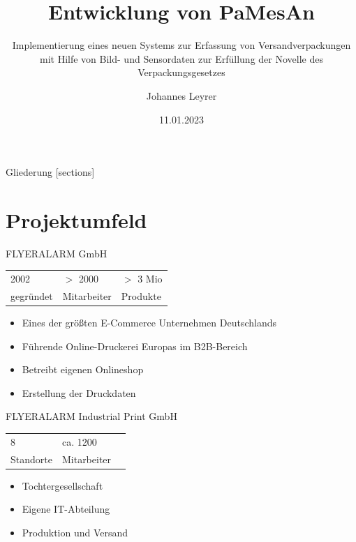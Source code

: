 \documentclass[10pt,ngerman]{beamer}
\title{Entwicklung von PaMesAn}
\date{11.01.2023}
\author{Johannes Leyrer}
\institute{FLYERALARM}
\subtitle{Implementierung eines neuen Systems zur Erfassung von Versandverpackungen mit Hilfe von Bild- und Sensordaten zur Erfüllung der Novelle des Verpackungsgesetzes}
\begin{document}
\maketitle

\begin{frame}{Gliederung}
  [sections]
  \tableofcontents[hideallsubsections]
\end{frame}

\section{Projektumfeld}
\begin{frame}[fragile]{FLYERALARM GmbH}

  \begin{table}
    \begin{tabular}{lll}
      2002      & $>$ 2000    & $>$ 3 Mio \\
      gegründet & Mitarbeiter & Produkte  \\
    \end{tabular}
  \end{table}

  \pause

  \begin{itemize}
    \item Eines der größten E-Commerce Unternehmen Deutschlands
          \pause
    \item Führende Online-Druckerei Europas im B2B-Bereich
          \pause
    \item Betreibt eigenen Onlineshop
          \pause
    \item Erstellung der Druckdaten
  \end{itemize}
\end{frame}


\begin{frame}[fragile]{FLYERALARM Industrial Print GmbH}

  \begin{table}
    \begin{tabular}{lll}
      8         & ca. 1200    \\
      Standorte & Mitarbeiter \\
    \end{tabular}
  \end{table}

  \pause

  \begin{itemize}
    \item Tochtergesellschaft
          \pause
    \item Eigene IT-Abteilung
          \pause
    \item Produktion und Versand
  \end{itemize}
\end{frame}
\end{document}
